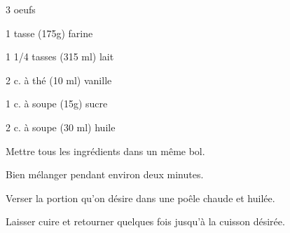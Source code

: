 %
%   
%   
%   
%




\totaltime{}


\begin{ingredients}
    \item 3 oeufs
    \item 1 tasse (175g) farine
    \item 1 1/4 tasses (315 ml) lait
    \item 2 c. à thé (10 ml) vanille
    \item 1 c. à soupe (15g) sucre
    \item 2 c. à soupe (30 ml) huile
\end{ingredients}

\begin{steps}
    \item Mettre tous les ingrédients dans un même bol.
    \item Bien mélanger pendant environ deux minutes.
    \item Verser la portion qu'on désire dans une poêle chaude et huilée.
    \item Laisser cuire et retourner quelques fois jusqu'à la cuisson désirée.
\end{steps}
